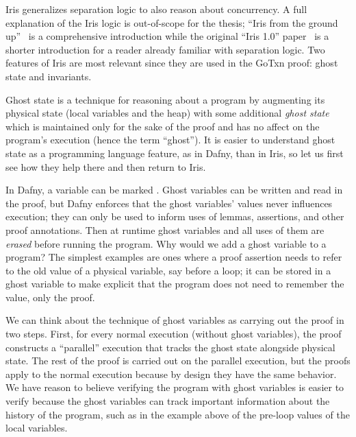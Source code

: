 
Iris generalizes separation logic to also reason about concurrency. A full
explanation of the Iris logic is out-of-scope for the thesis; ``Iris from the
ground up''~\cite{jung:iris-jfp} is a comprehensive introduction while the
original ``Iris 1.0'' paper~\cite{jung:iris-1} is a shorter introduction for a
reader already familiar with separation logic. Two features of Iris are most
relevant since they are used in the GoTxn proof: ghost state and invariants.

Ghost state is a technique for reasoning about a program by augmenting its
physical state (local variables and the heap) with some additional \emph{ghost
state} which is maintained only for the sake of the proof and has no affect on
the program's execution (hence the term ``ghost''). It is easier to understand
ghost state as a programming language feature, as in Dafny, than in Iris, so let
us first see how they help there and then return to Iris.

In Dafny, a variable can be marked . Ghost variables can be written
and read in the proof, but Dafny enforces that the ghost variables' values never
influences execution; they can only be used to inform uses of lemmas,
assertions, and other proof annotations. Then at runtime ghost variables and all
uses of them are \emph{erased} before running the program. Why would we add a
ghost variable to a program? The simplest examples are ones where a proof
assertion needs to refer to the old value of a physical variable, say before a
loop; it can be stored in a ghost variable to make explicit that the program
does not need to remember the value, only the proof.


We can think about the technique of ghost variables as carrying out the proof in
two steps. First, for every normal execution (without ghost variables), the
proof constructs a ``parallel'' execution that tracks the ghost state alongside
physical state. The rest of the proof is carried out on the parallel execution,
but the proofs apply to the normal execution because by design they have the
same behavior. We have reason to believe verifying the program with ghost
variables is easier to verify because the ghost variables can track important
information about the history of the program, such as in the example above of
the pre-loop values of the local variables.

